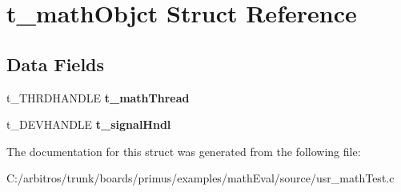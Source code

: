 \hypertarget{structt__math_objct}{\section{t\-\_\-math\-Objct Struct Reference}
\label{structt__math_objct}
}
\subsection*{Data Fields}
\begin{DoxyCompactItemize}
\item 
\hypertarget{structt__math_objct_a3b0d3fa41ea2ddad92e90fd239d48e88}{t\-\_\-\-T\-H\-R\-D\-H\-A\-N\-D\-L\-E {\bfseries t\-\_\-math\-Thread}}\label{structt__math_objct_a3b0d3fa41ea2ddad92e90fd239d48e88}

\item 
\hypertarget{structt__math_objct_ab14ef713ed09485609e3ddc0a485824b}{t\-\_\-\-D\-E\-V\-H\-A\-N\-D\-L\-E {\bfseries t\-\_\-signal\-Hndl}}\label{structt__math_objct_ab14ef713ed09485609e3ddc0a485824b}

\end{DoxyCompactItemize}


The documentation for this struct was generated from the following file\-:\begin{DoxyCompactItemize}
\item 
C\-:/arbitros/trunk/boards/primus/examples/math\-Eval/source/usr\-\_\-math\-Test.\-c\end{DoxyCompactItemize}
